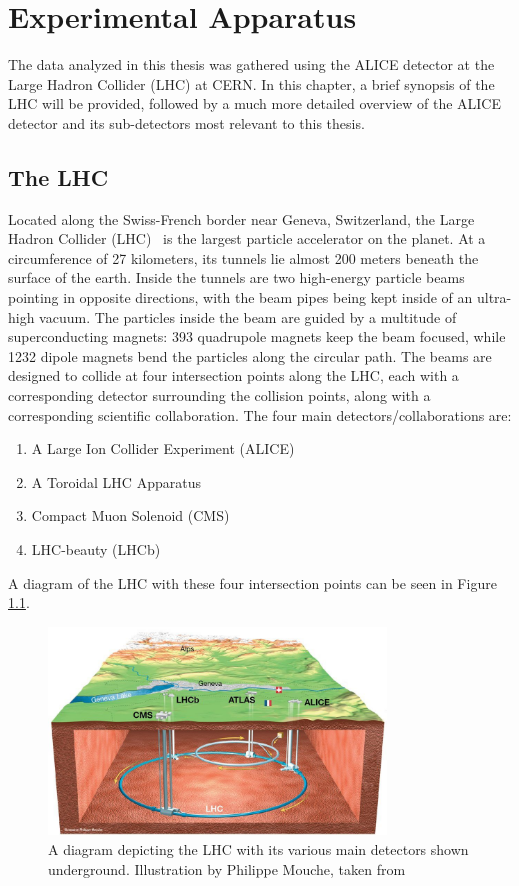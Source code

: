 \chapter{Experimental Apparatus}
\label{ch:experiment}

The data analyzed in this thesis was gathered using the ALICE detector at the Large Hadron Collider (LHC) at CERN. In this chapter, a brief synopsis of the LHC will be provided, followed by a much more detailed overview of the ALICE detector and its sub-detectors most relevant to this thesis.

\section{The LHC}
Located along the Swiss-French border near Geneva, Switzerland, the Large Hadron Collider (LHC)~\cite{LHC1, LHC2} is the largest particle accelerator on the planet. At a circumference of 27 kilometers, its tunnels lie almost 200 meters beneath the surface of the earth. Inside the tunnels are two high-energy particle beams pointing in opposite directions, with the beam pipes being kept inside of an ultra-high vacuum.
The particles inside the beam are guided by a multitude of superconducting magnets: 393 quadrupole magnets keep the beam focused, while 1232 dipole magnets bend the particles along the circular path. 
The beams are designed to collide at four intersection points along the LHC, each with a corresponding detector surrounding the collision points, along with a corresponding scientific collaboration. The four main detectors/collaborations are: 
\begin{enumerate}
\item A Large Ion Collider Experiment (ALICE)~\cite{ALICE} 
\item A Toroidal LHC Apparatus~\cite{ATLAS}
\item Compact Muon Solenoid (CMS)~\cite{CMS}
\item LHC-beauty (LHCb)~\cite{LHCb}
\end{enumerate}
A diagram of the LHC with these four intersection points can be seen in Figure \ref{fig:lhcring}.
\begin{figure}
    \centering
    \includegraphics[width=0.8\textwidth]{figures/experiment/lhcring_illustration.jpeg}
    \caption{A diagram depicting the LHC with its various main detectors shown underground. Illustration by Philippe Mouche, taken from~\cite{LHCBBC}}
    \label{fig:lhcring}
\end{figure}
